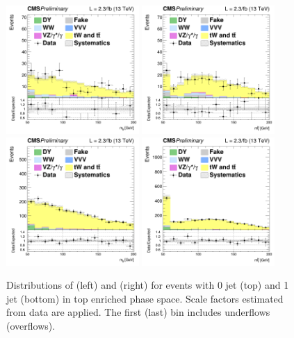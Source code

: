\begin{figure}[htbp]
\centering
\includegraphics[width=0.45\textwidth]{images/13TeV/cratio_hww2l2v_13TeV_top_of0j_mll.png}
\includegraphics[width=0.45\textwidth]{images/13TeV/cratio_hww2l2v_13TeV_top_of0j_mth.png}
\includegraphics[width=0.45\textwidth]{images/13TeV/cratio_hww2l2v_13TeV_top_of1j_mll.png}
\includegraphics[width=0.45\textwidth]{images/13TeV/cratio_hww2l2v_13TeV_top_of1j_mth.png}
\caption{
Distributions of \mll (left) and \mt (right) for events with 0 jet (top) and 1 jet (bottom) 
in top enriched phase space.
Scale factors estimated from data are applied. The first (last) bin includes underflows (overflows).
}
\label{fig:TopCtrl}
\end{figure}


